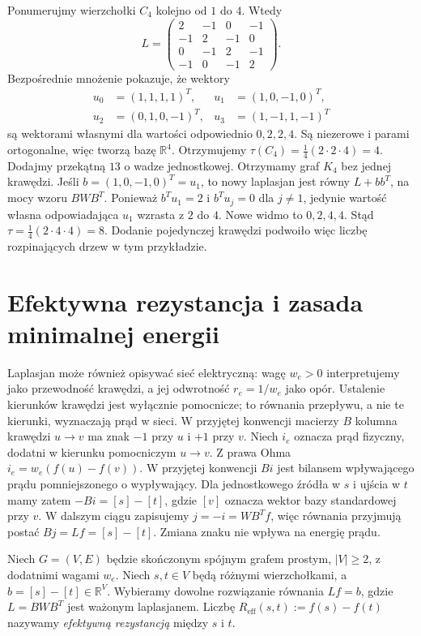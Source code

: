 \begin{przyklad}
Ponumerujmy wierzchołki $C_4$ kolejno od $1$ do $4$.
Wtedy
\[
L=\begin{pmatrix}
2&-1&0&-1\\-1&2&-1&0\\0&-1&2&-1\\-1&0&-1&2
\end{pmatrix}.
\]
Bezpośrednie mnożenie pokazuje, że wektory
\[
\begin{aligned}
u_0&=(1,1,1,1)^T,&u_1&=(1,0,-1,0)^T,\\
u_2&=(0,1,0,-1)^T,&u_3&=(1,-1,1,-1)^T
\end{aligned}
\]
są wektorami własnymi dla wartości odpowiednio
$0,2,2,4$. Są niezerowe i parami ortogonalne,
więc tworzą bazę $\mathbb R^4$.
Otrzymujemy $\tau(C_4)=\frac14(2\cdot2\cdot4)=4$.
Dodajmy przekątną $13$ o wadze jednostkowej.
Otrzymamy graf $K_4$ bez jednej krawędzi.
Jeśli $b=(1,0,-1,0)^T=u_1$, to nowy laplasjan
jest równy $L+bb^T$, na mocy wzoru $BWB^T$.
Ponieważ $b^Tu_1=2$ i $b^Tu_j=0$ dla $j\ne1$,
jedynie wartość własna odpowiadająca $u_1$
wzrasta z $2$ do $4$. Nowe widmo to $0,2,4,4$.
Stąd $\tau=\frac14(2\cdot4\cdot4)=8$.
Dodanie pojedynczej krawędzi podwoiło więc liczbę
rozpinających drzew w tym przykładzie.
\end{przyklad}

\section{Efektywna rezystancja i zasada minimalnej energii}
\label{sec:tg-resistance}

Laplasjan może również opisywać sieć elektryczną: wagę $w_e>0$
interpretujemy jako przewodność krawędzi, a jej odwrotność
$r_e=1/w_e$ jako opór. Ustalenie kierunków krawędzi jest wyłącznie
pomocnicze; to równania przepływu, a nie te kierunki, wyznaczają
prąd w sieci. W przyjętej konwencji macierzy $B$
kolumna krawędzi $u\to v$ ma znak $-1$ przy $u$
i $+1$ przy $v$. Niech $i_e$ oznacza prąd fizyczny, dodatni w kierunku
pomocniczym $u\to v$. Z prawa Ohma
$i_e=w_e(f(u)-f(v))$. W przyjętej konwencji
$Bi$ jest bilansem wpływającego prądu pomniejszonego
o wypływający. Dla jednostkowego źródła w $s$
i ujścia w $t$ mamy zatem $-Bi=[s]-[t]$, gdzie
$[v]$ oznacza wektor bazy standardowej przy $v$.
W dalszym ciągu zapisujemy $j=-i=WB^Tf$,
więc równania przyjmują postać $Bj=Lf=[s]-[t]$.
Zmiana znaku nie wpływa na energię prądu.

\begin{definicja}
Niech $G=(V,E)$ będzie skończonym spójnym grafem prostym,
$|V|\ge2$, z dodatnimi wagami $w_e$. Niech $s,t\in V$
będą różnymi wierzchołkami, a $b=[s]-[t]\in\mathbb R^V$.
Wybieramy dowolne rozwiązanie równania $Lf=b$,
gdzie $L=BWB^T$ jest ważonym laplasjanem.
Liczbę $R_{\mathrm{eff}}(s,t):=f(s)-f(t)$ nazywamy
\emph{efektywną rezystancją} między $s$ i $t$.
\end{definicja}

